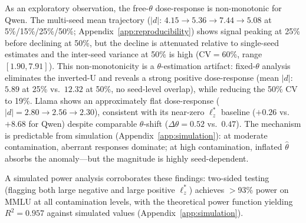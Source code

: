 As an exploratory observation, the free-$\theta$ dose-response is non-monotonic for Qwen.
The multi-seed mean trajectory ($|d|$: $4.15 \to 5.36 \to 7.44 \to 5.08$ at 5\%/15\%/25\%/50\%; Appendix~\ref{app:reproducibility}) shows signal peaking at 25\% before declining at 50\%, but the decline is attenuated relative to single-seed estimates and the inter-seed variance at 50\% is high (CV${=}$60\%, range $[1.90, 7.91]$).
This non-monotonicity is a $\theta$-estimation artifact: fixed-$\theta$ analysis eliminates the inverted-U and reveals a strong positive dose-response (mean $|d|$: $5.89$ at 25\% vs.\ $12.32$ at 50\%, no seed-level overlap), while reducing the 50\% CV to 19\%.
Llama shows an approximately flat dose-response ($|d|{=}2.80 \to 2.56 \to 2.30$), consistent with its near-zero $\ell_z^*$ baseline ($+0.26$ vs.\ ${+}8.68$ for Qwen) despite comparable $\theta$-shift ($\Delta\theta{=}0.52$ vs.\ $0.47$).
The mechanism is predictable from simulation (Appendix~\ref{app:simulation}): at moderate contamination, aberrant responses dominate; at high contamination, inflated $\hat{\theta}$ absorbs the anomaly---but the magnitude is highly seed-dependent.

A simulated power analysis corroborates these findings: two-sided testing (flagging both large negative and large positive $\ell_z^*$) achieves ${>}$93\% power on MMLU at all contamination levels, with the theoretical power function yielding $R^2 {=} 0.957$ against simulated values (Appendix~\ref{app:simulation}).
